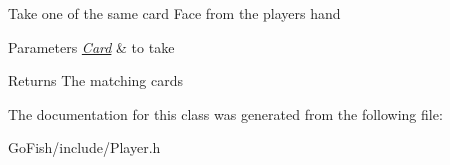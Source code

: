 Take one of the same card Face from the players hand 
\begin{DoxyParams}{Parameters}
{\em \hyperlink{class_card}{Card}} & to take \\
\hline
\end{DoxyParams}
\begin{DoxyReturn}{Returns}
The matching cards 
\end{DoxyReturn}


The documentation for this class was generated from the following file\-:\begin{DoxyCompactItemize}
\item 
Go\-Fish/include/Player.\-h\end{DoxyCompactItemize}

